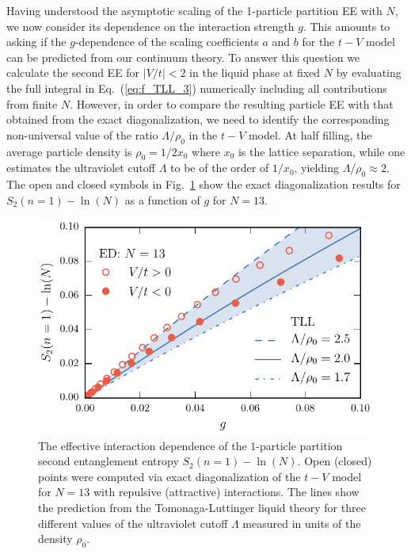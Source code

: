 Having understood the asymptotic scaling of the 1-particle partition \ren EE
with $N$, we now consider its dependence on the interaction strength $g$.  This
amounts to asking if the $g$-dependence of the scaling coefficients $a$ and $b$
for the $t-V$ model can be predicted from our continuum theory.  To answer this
question we calculate the second \ren EE for $|V/t| < 2$ in the liquid phase at
fixed $N$ by evaluating the full integral in Eq.~(\ref{eq:f_TLL_3}) numerically
including all contributions from finite $N$.
However, in order to compare the resulting particle EE with that obtained from
the exact diagonalization, we need to identify the corresponding non-universal
value of the ratio $\Lambda/\rho_0$ in the $t-V$ model. At half filling, the
average particle density is $\rho_0=1/2x_0$ where $x_0$ is the lattice
separation, while one estimates the ultraviolet cutoff $\Lambda$ to be of the
order of $1/x_0$, yielding $\Lambda/\rho_0 \approx 2$.  The open and closed
symbols in Fig.~\ref{fig:Svsg} show the exact diagonalization results for
$S_2(n=1)-\ln(N)$ as a function of $g$ for $N=13$.  
%
\begin{figure}[h]
\begin{center}
\includegraphics[width=0.7\columnwidth]{Images/ParticleEntanglement/PPE_interaction_dependence.pdf}
\end{center}
\caption{The effective interaction dependence of the $1$-particle partition
second \ren entanglement entropy $S_2(n=1)-\ln(N)$.  Open (closed)
points were computed via exact diagonalization of the $t-V$ model for $N=13$
with repulsive (attractive) interactions.  The lines show the prediction from
the Tomonaga-Luttinger liquid theory for three different values of the
ultraviolet cutoff $\Lambda$ measured in units of the density $\rho_0$.} 
\label{fig:Svsg}
 \end{figure}
